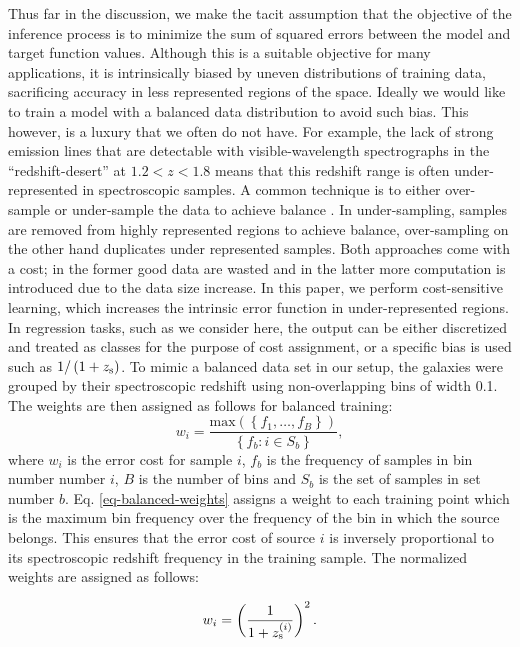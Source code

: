 \documentclass[useAMS,usenatbib,fleqn]{mn2e}
\begin{document}
Thus far in the discussion, we make the tacit assumption that the objective of the inference process is to minimize the sum of squared errors between the model and target function values. Although this is a suitable objective for many applications, it is intrinsically biased by uneven distributions of training data, sacrificing accuracy in less represented regions of the space. Ideally we would like to train a model with a balanced data distribution to avoid such bias. This however, is a luxury that we often do not have. For example, the lack of strong emission lines that are detectable with visible-wavelength spectrographs in the ``redshift-desert'' at $1.2 < z <1.8$ means that this redshift range is often under-represented in spectroscopic samples. A common technique is to either over-sample or under-sample the data to achieve balance \citep{weiss2007}. In under-sampling, samples are removed from highly represented regions to achieve balance, over-sampling on the other hand duplicates under represented samples. Both approaches come with a cost; in the former good data are wasted and in the latter more computation is introduced due to the data size increase. In this paper, we perform cost-sensitive learning, which increases the intrinsic error function in under-represented regions. In regression tasks, such as we consider here, the output can be either discretized and treated as classes for the purpose of cost assignment, or a specific bias is used such as $1/\left(1+z_{\rm s}\right)$. To mimic a balanced data set in our setup, the galaxies were grouped by their spectroscopic redshift using non-overlapping bins of width 0.1. The weights are then assigned as follows for balanced training:
\begin{equation}
\label{eq-balanced-weights}
w_{i} = \frac{\mbox{max}\left(\left \{f_{1},\hdots,f_{B}\right\}\right)}{\left\{f_{b}:i\in S_{b}\right\}},
\end{equation}
where $w_{i}$ is the error cost for sample $i$, $f_{b}$ is the frequency of samples in bin number number $i$, $B$ is the number of bins and $S_{b}$ is the set of samples in set number $b$. Eq. \eqref{eq-balanced-weights} assigns a weight to each training point which is the maximum bin frequency over the frequency of the bin in which the source belongs. This ensures that the error cost of source $i$ is inversely proportional to its spectroscopic redshift frequency in the training sample. The normalized weights are assigned as follows:

\begin{equation}
\label{eq-normalized-weights}
w_{i} = \left(\frac{1}{1+z_{\rm s}^{\left(i\right)}}\right)^{2}.
\end{equation}
\end{document}
